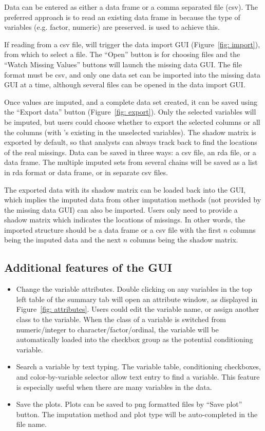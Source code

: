 \documentclass[article]{jss}
\begin{document}
Data can be entered as either a data frame or a comma separated file (csv). The preferred approach is to read an existing data frame in  because the type of variables (e.g. factor, numeric) are preserved.  is used to achieve this.

If reading from a csv file,  will trigger the data import GUI (Figure~\ref{fig: import}), from which to select a file. The ``Open'' button is for choosing files and the ``Watch Missing Values'' buttons will launch the missing data GUI. The file format must be csv, and only one data set can be imported into the missing data GUI at a time, although several files can be opened in the data import GUI.

Once values are imputed, and a complete data set created, it can be saved using the ``Export data'' button (Figure~\ref{fig: export}). Only the selected variables will be imputed, but users could choose whether to export the selected columns or all the columns (with 's existing in the unselected variables). The shadow matrix is exported by default, so that analysts can always track back to find the locations of the real missings. Data can be saved in three ways: a csv file, an rda file, or a data frame. The multiple imputed sets from several chains will be saved as a list in rda format or data frame, or in separate csv files.

The exported data with its shadow matrix can be loaded back into the GUI, which implies the imputed data from other imputation methods (not provided by the missing data GUI) can also be imported. Users only need to provide a shadow matrix which indicates the locations of missings. In other words, the imported structure should be a data frame or a csv file with the first $n$ columns being the imputed data and the next $n$ columns being the shadow matrix.



\subsection{Additional features of the GUI}

\begin{itemize}
\item Change the variable attributes. Double clicking on any variables in the top left table of the summary tab will open an attribute window, as displayed in Figure~\ref{fig: attributes}. Users could edit the variable name, or assign another class to the variable. When the class of a variable is switched from numeric/integer to character/factor/ordinal, the variable will be automatically loaded into the checkbox group as the potential conditioning variable.
\item Search a variable by text typing. The variable table, conditioning checkboxes, and color-by-variable selector allow text entry to find a variable. This feature is especially useful when there are many variables in the data.
\item Save the plots. Plots can be saved to png formatted files by ``Save plot'' button. The imputation method and plot type will be auto-completed in the file name.
\end{itemize}
\end{document}
